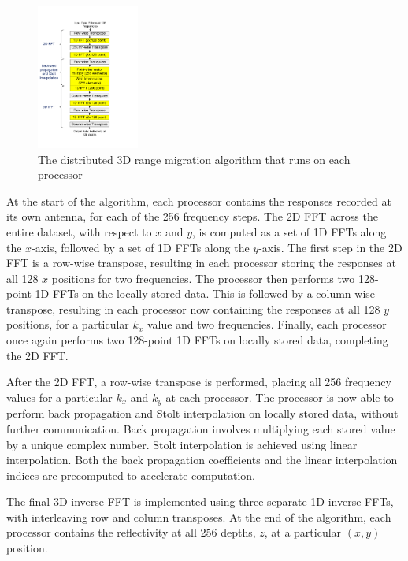 \documentclass[twocolumn]{article}
\begin{document}
\begin{figure}[!h]
\centering
\includegraphics*[width=0.3\textwidth, viewport=10 70 430 750]{figures/algorithm_labeled.pdf}
\caption{The distributed 3D range migration algorithm that runs on each processor}
\label{algorithm_labeled}
\end{figure}

At the start of the algorithm, each processor contains the responses recorded at its own antenna, for each of the 256 frequency steps. The 2D FFT across the entire dataset, with respect to $x$ and $y$, is computed as a set of 1D FFTs along the $x$-axis, followed by a set of 1D FFTs along the $y$-axis. The first step in the 2D FFT is a row-wise transpose, resulting in each processor storing the responses at all 128 $x$ positions for two frequencies. The processor then performs two 128-point 1D FFTs on the locally stored data. This is followed by a column-wise transpose, resulting in each processor now containing the responses at all 128 $y$ positions, for a particular $k_x$ value and two frequencies. Finally, each processor once again performs two 128-point 1D FFTs on locally stored data, completing the 2D FFT.

After the 2D FFT, a row-wise transpose is performed, placing all 256 frequency values for a particular $k_x$ and $k_y$ at each processor. The processor is now able to perform back propagation and Stolt interpolation on locally stored data, without further communication. Back propagation involves multiplying each stored value by a unique complex number. Stolt interpolation is achieved using linear interpolation. Both the back propagation coefficients and the linear interpolation indices are precomputed to accelerate computation.

The final 3D inverse FFT is implemented using three separate 1D inverse FFTs, with interleaving row and column transposes. At the end of the algorithm, each processor contains the reflectivity at all 256 depths, $z$, at a particular $(x,y)$ position.
\end{document}
